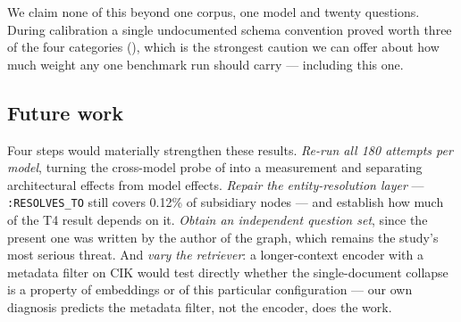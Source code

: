 We claim none of this beyond one corpus, one model and twenty questions. During
calibration a single undocumented schema convention proved worth three of the
four categories (), which is the strongest caution we can offer
about how much weight any one benchmark run should carry --- including this one.

\subsection*{Future work}

Four steps would materially strengthen these results. \emph{Re-run all 180
attempts per model}, turning the cross-model probe of  into a
measurement and separating architectural effects from model effects.
\emph{Repair the entity-resolution layer} --- \texttt{:RESOLVES\_TO} still covers
0.12\% of subsidiary nodes --- and establish how much of the T4 result depends on
it. \emph{Obtain an independent question set}, since the present one was written
by the author of the graph, which remains the study's most serious threat. And
\emph{vary the retriever}: a longer-context encoder with a metadata filter on CIK
would test directly whether the single-document collapse is a property of
embeddings or of this particular configuration --- our own diagnosis predicts the
metadata filter, not the encoder, does the work.
